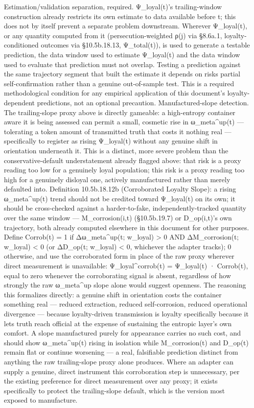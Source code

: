 \documentclass[
]{article}
\begin{document}
Estimation/validation separation, required. Ψ\_loyal(t)'s
trailing-window construction already restricts its own estimate to data
available before t; this does not by itself prevent a separate problem
downstream. Wherever Ψ\_loyal(t), or any quantity computed from it
(persecution-weighted ρ(j) via §8.6a.1, loyalty-conditioned outcomes via
§10.5b.18.13, Ψ\_total(t)), is used to generate a testable prediction,
the data window used to estimate Ψ\_loyal(t) and the data window used to
evaluate that prediction must not overlap. Testing a prediction against
the same trajectory segment that built the estimate it depends on risks
partial self-confirmation rather than a genuine out-of-sample test. This
is a required methodological condition for any empirical application of
this document's loyalty-dependent predictions, not an optional
precaution. Manufactured-slope detection. The trailing-slope proxy above
is directly gameable: a high-entropy container aware it is being
assessed can permit a small, cosmetic rise in ω\_meta\^{}up(t) ---
tolerating a token amount of transmitted truth that costs it nothing
real --- specifically to register as rising Ψ\_loyal(t) without any
genuine shift in orientation underneath it. This is a distinct, more
severe problem than the conservative-default understatement already
flagged above: that risk is a proxy reading too low for a genuinely
loyal population; this risk is a proxy reading too high for a genuinely
disloyal one, actively manufactured rather than merely defaulted into.
Definition 10.5b.18.12b (Corroborated Loyalty Slope): a rising
ω\_meta\^{}up(t) trend should not be credited toward Ψ\_loyal(t) on its
own; it should be cross-checked against a harder-to-fake,
independently-tracked quantity over the same window ---
M\_corrosion(i,t) (§10.5b.19.7) or D\_op(i,t)'s own trajectory, both
already computed elsewhere in this document for other purposes. Define
Corrob(t) = 1 if Δω\_meta\^{}up(t; w\_loyal) \textgreater{} 0 AND
ΔM\_corrosion(t; w\_loyal) \textless{} 0 (or ΔD\_op(t; w\_loyal)
\textless{} 0, whichever the adapter tracks); 0 otherwise, and use the
corroborated form in place of the raw proxy wherever direct measurement
is unavailable: Ψ\_loyal\^{}corrob(t) = Ψ\_loyal(t) · Corrob(t), equal
to zero whenever the corroborating signal is absent, regardless of how
strongly the raw ω\_meta\^{}up slope alone would suggest openness. The
reasoning this formalizes directly: a genuine shift in orientation costs
the container something real --- reduced extraction, reduced
self-corrosion, reduced operational divergence --- because
loyalty-driven transmission is loyalty specifically because it lets
truth reach official at the expense of sustaining the entropic layer's
own comfort. A slope manufactured purely for appearance carries no such
cost, and should show ω\_meta\^{}up(t) rising in isolation while
M\_corrosion(t) and D\_op(t) remain flat or continue worsening --- a
real, falsifiable prediction distinct from anything the raw
trailing-slope proxy alone produces. Where an adapter can supply a
genuine, direct instrument this corroboration step is unnecessary, per
the existing preference for direct measurement over any proxy; it exists
specifically to protect the trailing-slope default, which is the version
most exposed to manufacture.
\end{document}
